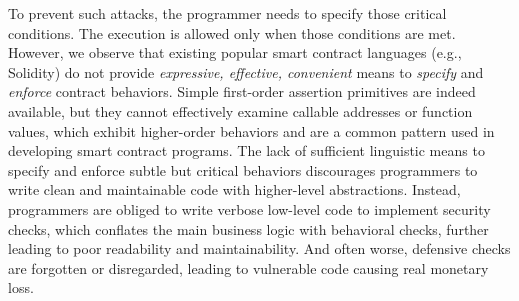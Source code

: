 

To prevent such attacks, the programmer needs to specify those critical
conditions. The execution is allowed only when those conditions are met.
However, we observe that existing popular smart contract languages (e.g.,
Solidity) do not provide \emph{expressive, effective, convenient} means to
\emph{specify} and \emph{enforce} contract behaviors.
Simple first-order assertion primitives are indeed available, but they cannot
effectively examine callable addresses or function values,
which exhibit
higher-order behaviors and are a common pattern used in developing smart contract
programs.
The lack of sufficient linguistic means to specify and enforce subtle but
critical behaviors discourages programmers to write clean and maintainable
code with higher-level abstractions.
Instead, programmers are obliged to write verbose low-level code
to implement security checks, which conflates the main business logic with
behavioral checks, further leading to poor readability and maintainability.
And often worse, defensive checks are forgotten or disregarded, leading to
vulnerable code causing real monetary loss.

